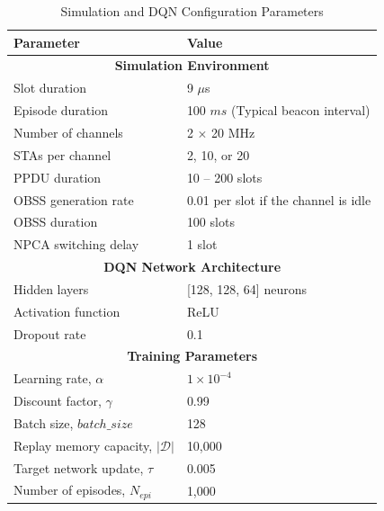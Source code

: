 \documentclass[conference]{IEEEtran}
\begin{document}
\begin{table}[]
\caption{Simulation and DQN Configuration Parameters}
\begin{center}
\begin{tabular}{|l|l|}
\hline
\textbf{Parameter} & \textbf{Value} \\
\hline
\multicolumn{2}{|c|}{\textbf{Simulation Environment}} \\
\hline
Slot duration & 9 $\mu$s \\
Episode duration & 100 $ms$ (Typical beacon interval) \\
Number of channels & 2 $\times$ 20 MHz \\
STAs per channel & 2, 10, or 20 \\
PPDU duration & 10 -- 200 slots \\
OBSS generation rate & 0.01 per slot if the channel is idle \\
OBSS duration & 100 slots \\
NPCA switching delay & 1 slot \\
\hline
\multicolumn{2}{|c|}{\textbf{DQN Network Architecture}} \\
\hline
Hidden layers & [128, 128, 64] neurons \\
Activation function & ReLU \\
Dropout rate & 0.1 \\
\hline
\multicolumn{2}{|c|}{\textbf{Training Parameters}} \\
\hline
Learning rate, $\alpha$ & $1 \times 10^{-4}$ \\
Discount factor, $\gamma$ & 0.99 \\
Batch size, $batch\_size$ & 128 \\
Replay memory capacity, $|\mathcal{D}|$ & 10,000 \\
Target network update, $\tau$ & 0.005 \\
Number of episodes, $N_{epi}$ & 1,000 \\
\hline
\end{tabular}
\label{tab:simulation_params}
\end{center}
\end{table}
\end{document}
